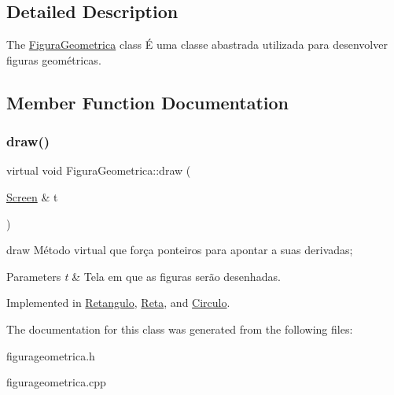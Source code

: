 \subsection{Detailed Description}
The \hyperlink{class_figura_geometrica}{Figura\+Geometrica} class É uma classe abastrada utilizada para desenvolver figuras geométricas. 

\subsection{Member Function Documentation}
\mbox{\label{class_figura_geometrica_a8ee8dedc060b6059a805ea091aef2c41}} 
\subsubsection{\texorpdfstring{draw()}{draw()}}
{\footnotesize\ttfamily virtual void Figura\+Geometrica\+::draw (\begin{DoxyParamCaption}\item[{\hyperlink{class_screen}{Screen} \&}]{t }\end{DoxyParamCaption})\hspace{0.3cm}{\ttfamily [pure virtual]}}



draw Método virtual que força ponteiros para apontar a suas derivadas; 


\begin{DoxyParams}{Parameters}
{\em t} & Tela em que as figuras serão desenhadas. \\
\hline
\end{DoxyParams}


Implemented in \hyperlink{class_retangulo_ac088dd6d3f4f3d3f80363a868c2e74f1}{Retangulo}, \hyperlink{class_reta_ac2e9805183cd474b62bffd8b032cd780}{Reta}, and \hyperlink{class_circulo_a593787d6e0618c2eded23e8839e7bea6}{Circulo}.



The documentation for this class was generated from the following files\+:\begin{DoxyCompactItemize}
\item 
figurageometrica.\+h\item 
figurageometrica.\+cpp\end{DoxyCompactItemize}

